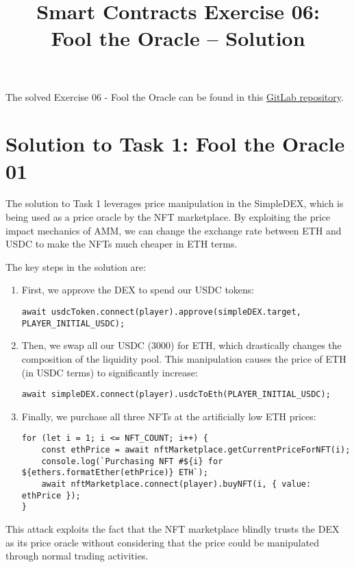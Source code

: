 \documentclass[12pt]{article}
\title{Smart Contracts Exercise 06: \\ Fool the Oracle -- Solution}
\author{}
\date{}
\begin{document}
\maketitle

\noindent
The solved Exercise 06 - Fool the Oracle can be found in this \href{https://gitlab.fel.cvut.cz/radovluk/smart-contracts-exercises/-/tree/main/06-Fool-the-Oracle/solution/solution-code?ref_type=heads}{GitLab repository}.

\section*{Solution to Task 1: Fool the Oracle 01}

The solution to Task 1 leverages price manipulation in the SimpleDEX, which is being used as a price oracle by the NFT marketplace. By exploiting the price impact mechanics of AMM, we can change the exchange rate between ETH and USDC to make the NFTs much cheaper in ETH terms.

The key steps in the solution are:

\begin{enumerate}
\item First, we approve the DEX to spend our USDC tokens:
\begin{verbatim}
await usdcToken.connect(player).approve(simpleDEX.target, PLAYER_INITIAL_USDC);
\end{verbatim}
\item Then, we swap all our USDC (3000) for ETH, which drastically changes the composition of the liquidity pool. This manipulation causes the price of ETH (in USDC terms) to significantly increase:
\begin{verbatim}
await simpleDEX.connect(player).usdcToEth(PLAYER_INITIAL_USDC);
\end{verbatim}

\item Finally, we purchase all three NFTs at the artificially low ETH prices:
\begin{verbatim}
for (let i = 1; i <= NFT_COUNT; i++) {
    const ethPrice = await nftMarketplace.getCurrentPriceForNFT(i);
    console.log(`Purchasing NFT #${i} for ${ethers.formatEther(ethPrice)} ETH`);
    await nftMarketplace.connect(player).buyNFT(i, { value: ethPrice });
}
\end{verbatim}
\end{enumerate}
This attack exploits the fact that the NFT marketplace blindly trusts the DEX as its price oracle without considering that the price could be manipulated through normal trading activities.
\end{document}
